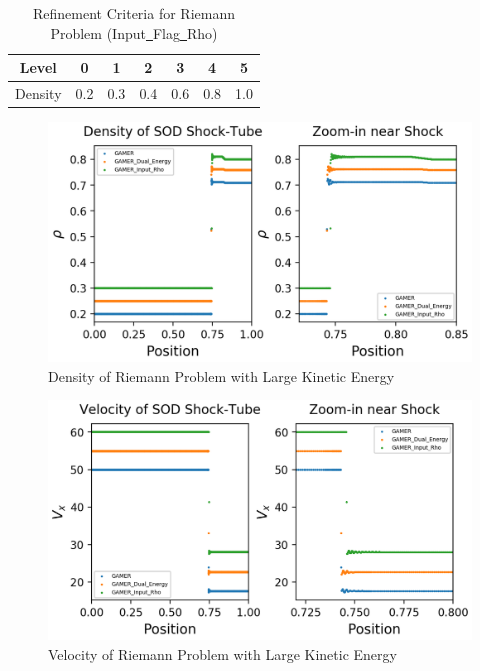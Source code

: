 \documentclass[a4paper,10pt]{article}
\begin{document}
\begin{table}[h]  %
\centering  %
\begin{tabular}[t]{|c|c|c|c|c|c|c|}
\hline
Level & 0 & 1 & 2 & 3 &4 &5 \\
\hline
Density  & 0.2 & 0.3 & 0.4 & 0.6 & 0.8 & 1.0 \\
\hline
\end{tabular}
\caption{Refinement Criteria for Riemann Problem (Input\underline{\ }Flag\underline{\ }Rho)}  %
\end{table}

\begin{figure}[htbp] %
\centering %
\includegraphics[width=15cm]{density_1-2.png} %
\caption{Density of Riemann Problem with Large Kinetic Energy}
\end{figure}

\begin{figure}[htbp] %
\centering %
\includegraphics[width=15cm]{velocity_1-2.png} %
\caption{Velocity of Riemann Problem with Large Kinetic Energy}
\end{figure}
\end{document}
